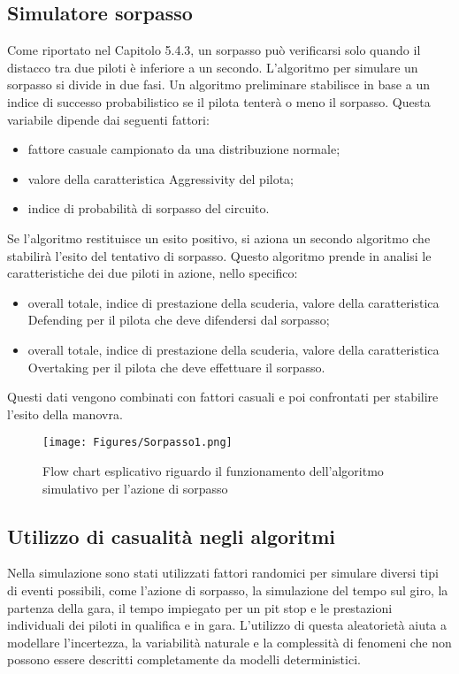 \subsection{Simulatore sorpasso}
Come riportato nel Capitolo 5.4.3, un sorpasso può verificarsi solo quando il distacco tra due piloti è inferiore a un secondo. L’algoritmo per simulare un sorpasso si divide in due fasi. Un algoritmo preliminare stabilisce in base a un indice di successo probabilistico se il pilota tenterà o meno il sorpasso. Questa variabile dipende dai seguenti fattori:
\begin{itemize}
    \item fattore casuale campionato da una distribuzione normale;
    \item valore della caratteristica Aggressivity del pilota;
    \item indice di probabilità di sorpasso del circuito.
\end{itemize}
Se l’algoritmo restituisce un esito positivo, si aziona un secondo algoritmo che stabilirà l’esito del tentativo di sorpasso. Questo algoritmo prende in analisi le caratteristiche dei due piloti in azione, nello specifico:
\begin{itemize}
    \item overall totale, indice di prestazione della scuderia, valore della caratteristica Defending per il pilota che deve difendersi dal sorpasso; 
    \item overall totale, indice di prestazione della scuderia, valore della caratteristica Overtaking per il pilota che deve effettuare il sorpasso.
\end{itemize}
Questi dati vengono combinati con fattori casuali e poi confrontati per stabilire l’esito della manovra.


\begin{figure}[h!]
    \centering
    \texttt{[image: Figures/Sorpasso1.png]}
    \caption{Flow chart esplicativo riguardo il funzionamento dell’algoritmo simulativo per l’azione di sorpasso}
    \label{fig:flowchart_simulatore_sorpasso}
\end{figure}

\subsection{Utilizzo di casualità negli algoritmi}
Nella simulazione sono stati utilizzati fattori randomici per simulare diversi tipi di eventi possibili, come l’azione di sorpasso, la simulazione del tempo sul giro, la partenza della gara, il tempo impiegato per un pit stop e le prestazioni individuali dei piloti in qualifica e in gara. L’utilizzo di questa aleatorietà aiuta a modellare l'incertezza, la variabilità naturale e la complessità di fenomeni che non possono essere descritti completamente da modelli deterministici.


